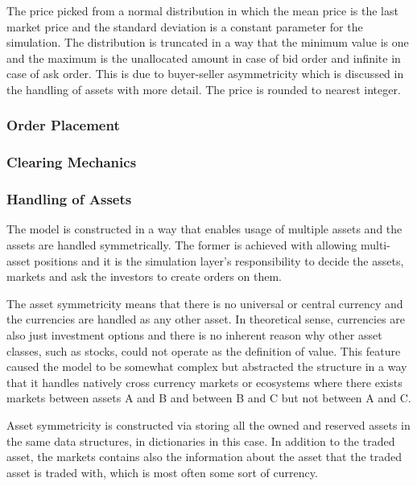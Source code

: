 The price picked from a normal distribution in which the
mean price is the last market price and the standard
deviation is a constant parameter for the simulation.
The distribution is truncated in a way that the minimum
value is one and the maximum is the unallocated amount
in case of bid order and infinite in case of ask order.
This is due to buyer-seller asymmetricity which is discussed
in the handling of assets with more detail. The price
is rounded to nearest integer.



\subsubsection{Order Placement}

\subsubsection{Clearing Mechanics}


\subsubsection{Handling of Assets}

The model is constructed in a way that enables usage of multiple assets
and the assets are handled symmetrically. The former is achieved with
allowing multi-asset positions and it is the simulation layer's 
responsibility to decide the assets, markets and ask the investors
to create orders on them.

The asset symmetricity means that there is no universal or central currency 
and the currencies are handled as any other asset. In theoretical sense, 
currencies are also just investment options and there is no inherent reason why other 
asset classes, such as stocks, could not operate as the definition 
of value. This feature caused the model to be somewhat complex but 
abstracted the structure in a way that it handles natively cross currency
markets or ecosystems where there exists markets between assets A and 
B and between B and C but not between A and C. 

Asset symmetricity is constructed via storing all the owned and reserved
assets in the same data structures, in dictionaries in this case. In addition
to the traded asset, the markets contains also the information about the asset
that the traded asset is traded with, which is most often some sort of currency. 

